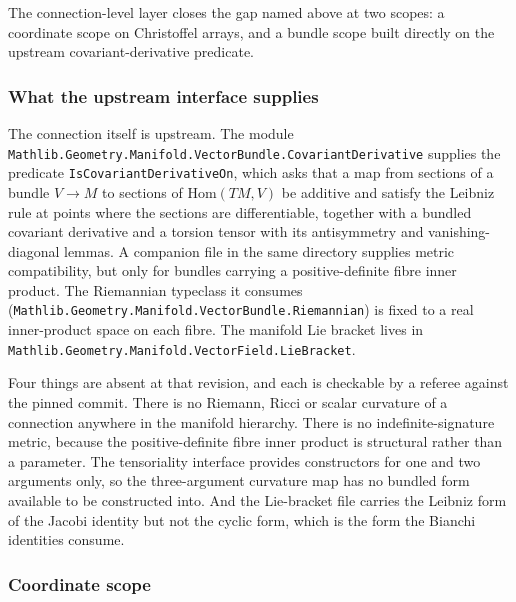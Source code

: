 \documentclass[11pt]{article}
\begin{document}
The connection-level layer closes the gap named above at two scopes: a
coordinate scope on Christoffel arrays, and a bundle scope built
directly on the upstream covariant-derivative predicate.

\subsubsection{What the upstream interface supplies}

The connection itself is upstream. The module
\texttt{Mathlib.Geometry.Manifold.VectorBundle.CovariantDerivative}
supplies the predicate
\texttt{IsCovariantDerivativeOn}, which asks that a map from sections of
a bundle $V \to M$ to sections of $\mathrm{Hom}(TM, V)$ be additive and
satisfy the Leibniz rule at points where the sections are
differentiable, together with a bundled covariant derivative and
a torsion tensor with its antisymmetry and vanishing-diagonal lemmas.
A companion file in the same directory supplies metric compatibility,
but only for bundles carrying a positive-definite fibre inner product.
The Riemannian typeclass it consumes
(\texttt{Mathlib.Geometry.Manifold.VectorBundle.Riemannian}) is fixed to
a real inner-product space on each fibre. The manifold Lie bracket lives
in \texttt{Mathlib.Geometry.Manifold.VectorField.LieBracket}.

Four things are absent at that revision, and each is checkable by a
referee against the pinned commit. There is no Riemann, Ricci or scalar
curvature of a connection anywhere in the manifold hierarchy. There is
no indefinite-signature metric, because the positive-definite fibre
inner product is structural rather than a parameter. The tensoriality
interface provides constructors for one and two arguments only, so the
three-argument curvature map has no bundled form available to be
constructed into. And the Lie-bracket file carries the Leibniz form of
the Jacobi identity but not the cyclic form, which is the form the
Bianchi identities consume.

\subsubsection{Coordinate scope}
\end{document}
